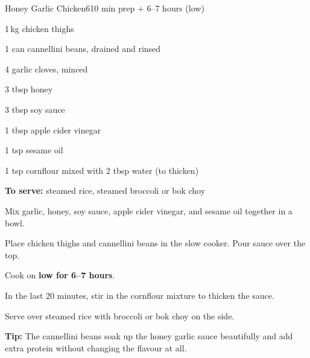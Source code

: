 \begin{recipebox}{Honey Garlic Chicken}{6}{10 min prep + 6--7 hours (low)}
\begin{ingredients}
  \item 1\,kg chicken thighs
  \item 1 can cannellini beans, drained and rinsed
  \item 4 garlic cloves, minced
  \item 3 tbsp honey
  \item 3 tbsp soy sauce
  \item 1 tbsp apple cider vinegar
  \item 1 tsp sesame oil
  \item 1 tsp cornflour mixed with 2 tbsp water (to thicken)
  \item \textbf{To serve:} steamed rice, steamed broccoli or bok choy
\end{ingredients}

\begin{method}
  \item Mix garlic, honey, soy sauce, apple cider vinegar, and sesame oil together in a bowl.
  \item Place chicken thighs and cannellini beans in the slow cooker. Pour sauce over the top.
  \item Cook on \textbf{low for 6--7 hours}.
  \item In the last 20 minutes, stir in the cornflour mixture to thicken the sauce.
  \item Serve over steamed rice with broccoli or bok choy on the side.
\end{method}

\begin{notelist}
  \item \textbf{Tip:} The cannellini beans soak up the honey garlic sauce beautifully and add extra protein without changing the flavour at all.
\end{notelist}
\end{recipebox}
